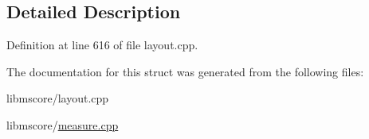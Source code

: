 \subsection{Detailed Description}


Definition at line 616 of file layout.\+cpp.



The documentation for this struct was generated from the following files\+:\begin{DoxyCompactItemize}
\item 
libmscore/layout.\+cpp\item 
libmscore/\hyperlink{measure_8cpp}{measure.\+cpp}\end{DoxyCompactItemize}
